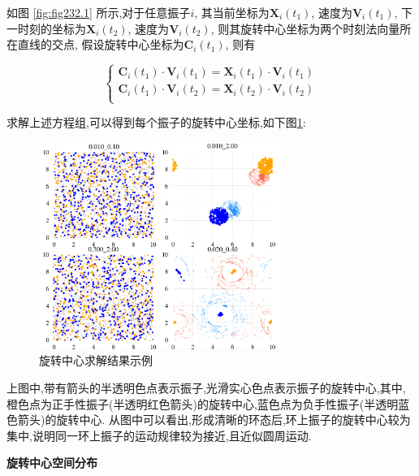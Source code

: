 \documentclass{article}
\begin{document}
如图 \ref{fig:fig232.1} 所示,对于任意振子$i$, 其当前坐标为$\mathbf{X}_i\left( t_1 \right)$, 速度为$\mathbf{V}_i\left( t_1 \right)$, 下一时刻的坐标为$\mathbf{X}_i\left( t_2 \right)$, 速度为$\mathbf{V}_i\left( t_2 \right)$, 则其旋转中心坐标为两个时刻法向量所在直线的交点, 假设旋转中心坐标为$\mathbf{C}_i\left( t_1 \right)$, 则有

\vspace{-0.5cm}

$$
\begin{cases}
	\mathbf{C}_i\left( t_1 \right) \cdot \mathbf{V}_i\left( t_1 \right) =\mathbf{X}_i\left( t_1 \right) \cdot \mathbf{V}_i\left( t_1 \right) \\
	\mathbf{C}_i\left( t_1 \right) \cdot \mathbf{V}_i\left( t_2 \right) =\mathbf{X}_i\left( t_2 \right) \cdot \mathbf{V}_i\left( t_2 \right) \\
\end{cases}
$$

求解上述方程组,可以得到每个振子的旋转中心坐标,如下图\ref{fig:fig232.2}:%

\begin{figure}[H]
	\centering
	\includegraphics[width=0.7\textwidth]{./figs/centorsBigGraph_sub.png}
	\vspace{-0.2cm}
	\caption{旋转中心求解结果示例}
	\label{fig:fig232.2}
\end{figure}

上图中,带有箭头的半透明色点表示振子,光滑实心色点表示振子的旋转中心,其中,橙色点为正手性振子(半透明红色箭头)的旋转中心,蓝色点为负手性振子(半透明蓝色箭头)的旋转中心. 从图中可以看出,形成清晰的环态后,环上振子的旋转中心较为集中,说明同一环上振子的运动规律较为接近,且近似圆周运动.

\newpage
\noindent\textbf{旋转中心空间分布}
\end{document}
